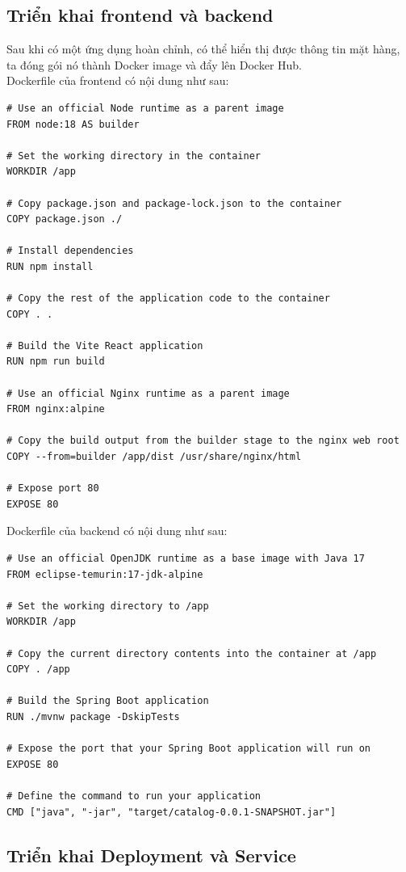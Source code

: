 \subsection{Triển khai frontend và backend}
\noindent Sau khi có một ứng dụng hoàn chỉnh, có thể hiển thị được thông tin mặt hàng, ta đóng gói nó thành Docker image và đẩy lên Docker Hub.\\[0.5cm]
Dockerfile của frontend có nội dung như sau:
\begin{lstlisting}[language=docker]
# Use an official Node runtime as a parent image
FROM node:18 AS builder

# Set the working directory in the container
WORKDIR /app

# Copy package.json and package-lock.json to the container
COPY package.json ./

# Install dependencies
RUN npm install

# Copy the rest of the application code to the container
COPY . .

# Build the Vite React application
RUN npm run build

# Use an official Nginx runtime as a parent image
FROM nginx:alpine

# Copy the build output from the builder stage to the nginx web root
COPY --from=builder /app/dist /usr/share/nginx/html

# Expose port 80
EXPOSE 80
\end{lstlisting}

Dockerfile của backend có nội dung như sau:

\begin{lstlisting}[language=docker]
# Use an official OpenJDK runtime as a base image with Java 17
FROM eclipse-temurin:17-jdk-alpine

# Set the working directory to /app
WORKDIR /app

# Copy the current directory contents into the container at /app
COPY . /app

# Build the Spring Boot application
RUN ./mvnw package -DskipTests

# Expose the port that your Spring Boot application will run on
EXPOSE 80

# Define the command to run your application
CMD ["java", "-jar", "target/catalog-0.0.1-SNAPSHOT.jar"]
\end{lstlisting}

\subsection{Triển khai Deployment và Service}
